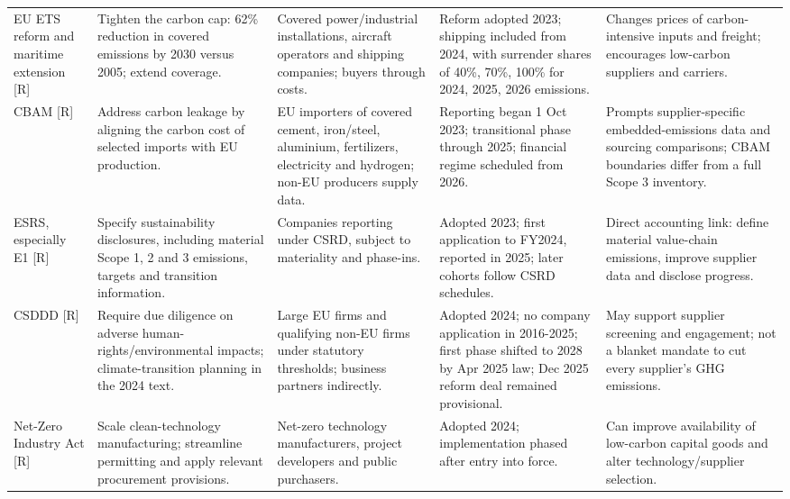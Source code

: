 \documentclass[10pt,a4paper,landscape]{article}
\begin{document}
\begin{tabularx}{\textwidth}{Y{0.85}Y{1.00}Y{0.85}Y{1.05}Y{1.25}}
\addlinespace[5pt]
EU ETS reform and maritime extension [R]\cite{fit55} & Tighten the carbon cap: 62\% reduction in covered emissions by 2030 versus 2005; extend coverage. & Covered power/industrial installations, aircraft operators and shipping companies; buyers through costs. & Reform adopted 2023; shipping included from 2024, with surrender shares of 40\%, 70\%, 100\% for 2024, 2025, 2026 emissions. & Changes prices of carbon-intensive inputs and freight; encourages low-carbon suppliers and carriers. \\
\addlinespace[5pt]
CBAM [R]\cite{cbam} & Address carbon leakage by aligning the carbon cost of selected imports with EU production. & EU importers of covered cement, iron/steel, aluminium, fertilizers, electricity and hydrogen; non-EU producers supply data. & Reporting began 1 Oct 2023; transitional phase through 2025; financial regime scheduled from 2026. & Prompts supplier-specific embedded-emissions data and sourcing comparisons; CBAM boundaries differ from a full Scope 3 inventory. \\
\addlinespace[5pt]
ESRS, especially E1 [R]\cite{esrs} & Specify sustainability disclosures, including material Scope 1, 2 and 3 emissions, targets and transition information. & Companies reporting under CSRD, subject to materiality and phase-ins. & Adopted 2023; first application to FY2024, reported in 2025; later cohorts follow CSRD schedules. & Direct accounting link: define material value-chain emissions, improve supplier data and disclose progress. \\
\addlinespace[5pt]
CSDDD [R]\cite{csddd,stopclock,omnibus} & Require due diligence on adverse human-rights/environmental impacts; climate-transition planning in the 2024 text. & Large EU firms and qualifying non-EU firms under statutory thresholds; business partners indirectly. & Adopted 2024; no company application in 2016-2025; first phase shifted to 2028 by Apr 2025 law; Dec 2025 reform deal remained provisional. & May support supplier screening and engagement; not a blanket mandate to cut every supplier's GHG emissions. \\
\addlinespace[5pt]
Net-Zero Industry Act [R]\cite{nzia} & Scale clean-technology manufacturing; streamline permitting and apply relevant procurement provisions. & Net-zero technology manufacturers, project developers and public purchasers. & Adopted 2024; implementation phased after entry into force. & Can improve availability of low-carbon capital goods and alter technology/supplier selection. \\

\end{tabularx}
\end{document}
